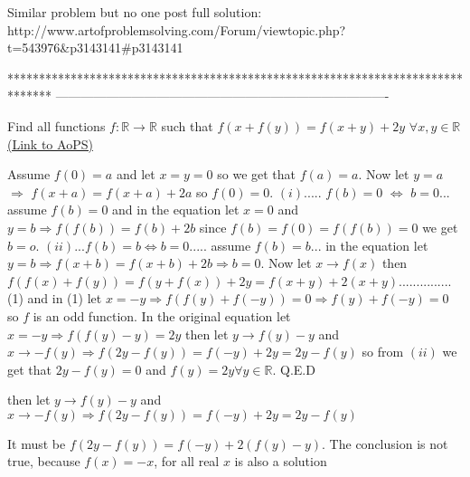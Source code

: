 \begin{solution}
	Similar problem but no one post full solution:
 http://www.artofproblemsolving.com/Forum/viewtopic.php?t=543976&p3143141#p3143141
\end{solution}
*******************************************************************************
-------------------------------------------------------------------------------

\begin{problem}
	Find all functions $f:\mathbb{R} \rightarrow \mathbb{R}$ such that 
                                                         $f(x+f(y))=f(x+y)+2y$              $\forall x,y \in \mathbb{R}$
	\flushright \href{https://artofproblemsolving.com/community/c6h543976}{(Link to AoPS)}
\end{problem}



\begin{solution}
	Assume $f(0)=a$ and let $x=y=0$ so we get that $f(a)=a$. Now let $y=a$ $\Rightarrow$ $f(x+a)=f(x+a)+2a$ so $f(0)=0$.
$(i)$..... $f(b)=0$ $\Leftrightarrow$ $b=0$...
assume $f(b)=0$ and in the equation let $x=0$ and  $y=b \Rightarrow f(f(b))=f(b)+2b$ since $f(b)=f(0)=f(f(b))=0$ we get $b=o$.
$(ii)... f(b)=b \Leftrightarrow b=0$.....
assume $f(b)=b$... in the equation let $y=b \Rightarrow f(x+b)=f(x+b)+2b \Rightarrow b=0$.
Now let $x \to f(x)$ then $f(f(x)+f(y))=f(y+f(x))+2y=f(x+y)+2(x+y)$...............(1)
and in (1) let $x=-y \Rightarrow f(f(y)+f(-y))=0 \Rightarrow f(y)+f(-y)=0$ so $f$ is an odd function.
In the original equation let $x=-y \Rightarrow f(f(y)-y)=2y$ then let $y \to f(y)-y$ and $x \to -f(y) 
 \Rightarrow f(2y-f(y))=f(-y)+2y=2y-f(y)$ so from $(ii)$ we get that $2y-f(y)=0$ and $f(y)=2y \forall y \in \mathbb{R}$. Q.E.D
\end{solution}



\begin{solution}
	\begin{tcolorbox}
 then let $y \to f(y)-y$ and $x \to -f(y) 
 \Rightarrow f(2y-f(y))=f(-y)+2y=2y-f(y)$ \end{tcolorbox}
It must be $ f(2y-f(y))=f(-y)+2(f(y)-y) $. The conclusion is not true, because $ f(x)=-x $, for all real $ x $ is also a solution
\end{solution}



